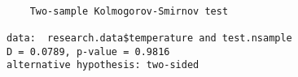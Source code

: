 \begin{verbatim} 

	Two-sample Kolmogorov-Smirnov test

data:  research.data$temperature and test.nsample
D = 0.0789, p-value = 0.9816
alternative hypothesis: two-sided

\end{verbatim}